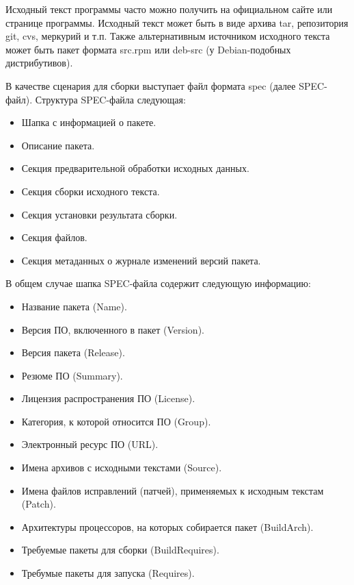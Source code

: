 \documentclass[bachelor, och, pract]{SCWorks}
\begin{document}
Исходный текст программы часто можно получить на официальном сайте или странице программы.
Исходный текст может быть в виде архива tar, репозитория git, cvs, меркурий и т.п.
Также альтернативным источником исходного текста может быть пакет формата src.rpm или deb-src (у Debian-подобных дистрибутивов)\cite{a_rpm}.

В качестве сценария для сборки выступает файл формата spec (далее SPEC-файл).
Структура SPEC-файла следующая:
\begin{itemize}                                                                           
    \item Шапка с информацией о пакете.                          
    \item Описание пакета.              
    \item Секция предварительной обработки исходных данных.
    \item Секция сборки исходного текста.
    \item Секция установки результата сборки.
    \item Секция файлов.
    \item Секция метаданных о журнале изменений версий пакета.
\end{itemize}

В общем случае шапка SPEC-файла содержит следующую информацию:
\begin{itemize}                                                                                      
    \item Название пакета (Name).                                                              
    \item Версия ПО, включенного в пакет (Version).                                                                           
    \item Версия пакета (Release).                                          
    \item Резюме ПО (Summary).                                                            
    \item Лицензия распространения ПО (License).                   
    \item Категория, к которой относится ПО (Group).
    \item Электронный ресурс ПО (URL). 
    \item Имена архивов с исходными текстами (Source).
    \item Имена файлов исправлений (патчей), применяемых к исходным текстам (Patch).
    \item Архитектуры процессоров, на которых собирается пакет (BuildArch).
    \item Требуемые пакеты для сборки (BuildRequires).
    \item Требумые пакеты для запуска (Requires).
\end{itemize}
\end{document}
